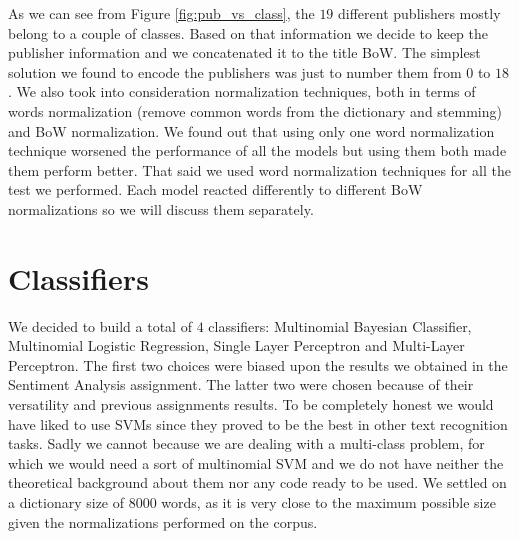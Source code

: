 \documentclass[10pt,a4paper]{report}
\begin{document}
As we can see from Figure \ref{fig:pub_vs_class}, the $19$ different publishers mostly belong to a couple of classes. Based on that information we decide to keep the publisher information and we concatenated it to the title BoW. The simplest solution we found to encode the publishers was just to number them from $0$ to $18$. We also took into consideration normalization techniques, both in terms of words normalization (remove common words from the dictionary and stemming) and BoW normalization. We found out that using only one word normalization technique worsened the performance of all the models but using them both made them perform better. That said we used word normalization techniques for all the test we performed. Each model reacted differently to different BoW normalizations so we will discuss them separately.  
\section{Classifiers}
We decided to build a total of $4$ classifiers: Multinomial Bayesian Classifier, Multinomial Logistic Regression, Single Layer Perceptron and Multi-Layer Perceptron. The first two choices were biased upon the results we obtained in the Sentiment Analysis assignment. The latter two were chosen because of their versatility and previous assignments results. To be completely honest we would have liked to use SVMs since they proved to be the best in other text recognition tasks. Sadly we cannot because we are dealing with a multi-class problem, for which we would need a sort of multinomial SVM and we do not have neither the theoretical background about them nor any code ready to be used. We settled on a dictionary size of $8000$ words, as it is very close to the maximum possible size given the normalizations performed on the corpus.
\end{document}
